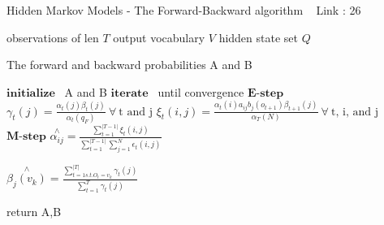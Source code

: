 \documentclass[a4paper]{article}
\begin{document}
\begin{algorithm}
   \caption{ Hidden Markov Models - The Forward-Backward algorithm ~\cite{ jurafsky_martin_2008} Link : 26
    }
   
   
  \begin{algorithmic}[1]
  
   \INPUT
   \Statex observations of len $T$
   \Statex output vocabulary $V$
   \Statex hidden state set $Q$
   
   \OUTPUT
   \Statex The forward and backward probabilities A and B
   
   \State $\textbf{initialize}$ \ A and B
   \State $\textbf{iterate}$ \ until convergence
   $\textbf{E-step}$
   \State $\gamma_{t}(j) = \frac{\alpha_{t}(j) \beta_{t}(j)}{\alpha_{t}(q_{F})} \   \forall \  \text{t and j}$
   \State $\xi_{t}(i,j) = \frac{\alpha_{t}(i)a_{ij}b_{j}(o_{t+1}) \beta_{t+1}(j)}{\alpha_{T}(N)} \   \forall \  \text{t, i, and j}$
   $\textbf{M-step}$
   \State $\overset{\wedge}{\alpha_{ij}} = \frac{ \operatorname*{\sum}_{t=1}^{|T-1|} \xi_{t}(i,j)}{\operatorname*{\sum}_{t=1}^{|T-1|} \operatorname*{\sum}_{j=1}^{N} \epsilon_{t}(i,j) } $
   
   \State $\overset{\wedge}{\beta_{j}(v_{k})} = \frac{\operatorname*{\sum}_{t=1s.t. O_{t} = v_{k}}^{|T|} \gamma_{t} (j) }{\operatorname*{\sum}_{t=1}^{T} \gamma_{t}(j)}$
  
  \State return A,B

 \end{algorithmic}

\end{algorithm}



 \newpage







\end{document}
